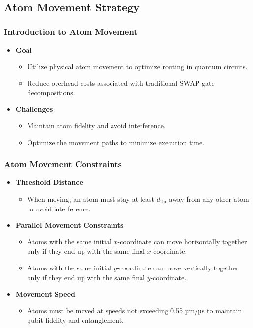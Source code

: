 \documentclass[18 pt]{beamer}
\begin{document}
\subsection{Atom Movement Strategy}
\begin{frame}
    \frametitle{Introduction to Atom Movement}
    \begin{itemize}
        \item \textbf{Goal}
        \begin{itemize}
            \item Utilize physical atom movement to optimize routing in quantum circuits.
            \item Reduce overhead costs associated with traditional SWAP gate decompositions.
        \end{itemize}
        \item \textbf{Challenges}
        \begin{itemize}
            \item Maintain atom fidelity and avoid interference.
            \item Optimize the movement paths to minimize execution time.
        \end{itemize}
    \end{itemize}
\end{frame}

\begin{frame}
    \frametitle{Atom Movement Constraints}
    \begin{itemize}
        \item \textbf{Threshold Distance}
        \begin{itemize}
            \item When moving, an atom must stay at least $d_{\text{thr}}$ away from any other atom to avoid interference.
        \end{itemize}
        \item \textbf{Parallel Movement Constraints}
        \begin{itemize}
            \item Atoms with the same initial $x$-coordinate can move horizontally together only if they end up with the same final $x$-coordinate.
            \item Atoms with the same initial $y$-coordinate can move vertically together only if they end up with the same final $y$-coordinate.
        \end{itemize}
        \item \textbf{Movement Speed}
        \begin{itemize}
            \item Atoms must be moved at speeds not exceeding 0.55 µm/µs to maintain qubit fidelity and entanglement.
        \end{itemize}
    \end{itemize}
\end{frame}
\end{document}
